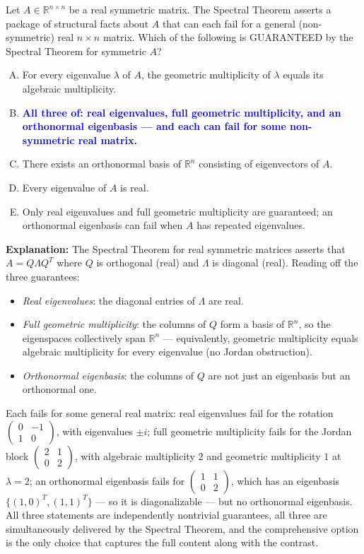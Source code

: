 \documentclass[12pt]{amsart}
\begin{document}
Let $A \in \mathbb{R}^{n \times n}$ be a real symmetric matrix. The Spectral
Theorem asserts a package of structural facts about $A$ that can each fail
for a general (non-symmetric) real $n \times n$ matrix. Which of the
following is GUARANTEED by the Spectral Theorem for symmetric $A$?

\begin{enumerate}[(A)]
\item For every eigenvalue $\lambda$ of $A$, the geometric multiplicity of $\lambda$ equals its algebraic multiplicity.
\item \textcolor{blue}{\textbf{All three of: real eigenvalues, full geometric multiplicity, and an orthonormal eigenbasis --- and each can fail for some non-symmetric real matrix.}}
\item There exists an orthonormal basis of $\mathbb{R}^n$ consisting of eigenvectors of $A$.
\item Every eigenvalue of $A$ is real.
\item Only real eigenvalues and full geometric multiplicity are guaranteed; an orthonormal eigenbasis can fail when $A$ has repeated eigenvalues.
\end{enumerate}

\textbf{Explanation:}
The Spectral Theorem for real symmetric matrices asserts that
$A = Q\Lambda Q^T$ where $Q$ is orthogonal (real) and $\Lambda$ is diagonal
(real). Reading off the three guarantees:
\begin{itemize}
\item \emph{Real eigenvalues}: the diagonal entries of $\Lambda$ are real.
\item \emph{Full geometric multiplicity}: the columns of $Q$ form a basis of $\mathbb{R}^n$, so the eigenspaces collectively span $\mathbb{R}^n$ --- equivalently, geometric multiplicity equals algebraic multiplicity for every eigenvalue (no Jordan obstruction).
\item \emph{Orthonormal eigenbasis}: the columns of $Q$ are not just an eigenbasis but an orthonormal one.
\end{itemize}

Each fails for some general real matrix: real eigenvalues fail for the
rotation $\begin{pmatrix} 0 & -1 \\ 1 & 0 \end{pmatrix}$, with eigenvalues
$\pm i$; full geometric multiplicity fails for the Jordan block
$\begin{pmatrix} 2 & 1 \\ 0 & 2 \end{pmatrix}$, with algebraic multiplicity
$2$ and geometric multiplicity $1$ at $\lambda = 2$; an orthonormal
eigenbasis fails for $\begin{pmatrix} 1 & 1 \\ 0 & 2 \end{pmatrix}$, which
has an eigenbasis $\{(1,0)^T, (1,1)^T\}$ --- so it is diagonalizable ---
but no orthonormal eigenbasis. All three statements are independently
nontrivial guarantees, all three are simultaneously delivered by the
Spectral Theorem, and the comprehensive option is the only choice that
captures the full content along with the contrast.
\end{document}
